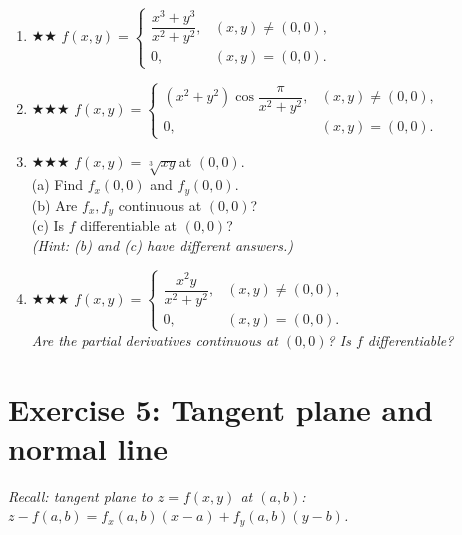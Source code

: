 \documentclass[12pt,a4paper]{article}
\newcommand{\medium}{{\color{orange}$\bigstar\bigstar$}}
\newcommand{\hard}{{\color{red}$\bigstar\bigstar\bigstar$}}
\begin{document}
\begin{enumerate}[leftmargin=*, label=(\alph*)]

\item \medium\quad
$f(x,y)=\begin{cases}
\dfrac{x^3+y^3}{x^2+y^2}, & (x,y)\ne(0,0),\\[6pt]
0, & (x,y)=(0,0).
\end{cases}$

\item \hard\quad
$f(x,y)=\begin{cases}
(x^2+y^2)\cos\!\dfrac{\pi}{x^2+y^2}, & (x,y)\ne(0,0),\\[6pt]
0, & (x,y)=(0,0).
\end{cases}$

\item \hard\quad
$f(x,y) = \sqrt[3]{xy}$\quad at $(0,0)$.\\[4pt]
(a) Find $f_x(0,0)$ and $f_y(0,0)$.\\
(b) Are $f_x,f_y$ continuous at $(0,0)$?\\
(c) Is $f$ differentiable at $(0,0)$?\\
\emph{(Hint: (b) and (c) have different answers.)}

\item \hard\quad
$f(x,y)=\begin{cases}
\dfrac{x^2 y}{x^2+y^2}, & (x,y)\ne(0,0),\\[6pt]
0, & (x,y)=(0,0).
\end{cases}$\\[4pt]
\emph{Are the partial derivatives continuous at $(0,0)$? Is $f$ differentiable?}

\end{enumerate}

\section*{Exercise 5: Tangent plane and normal line}

\emph{Recall: tangent plane to $z=f(x,y)$ at $(a,b)$:
$z - f(a,b) = f_x(a,b)(x-a)+f_y(a,b)(y-b)$.}
\end{document}

